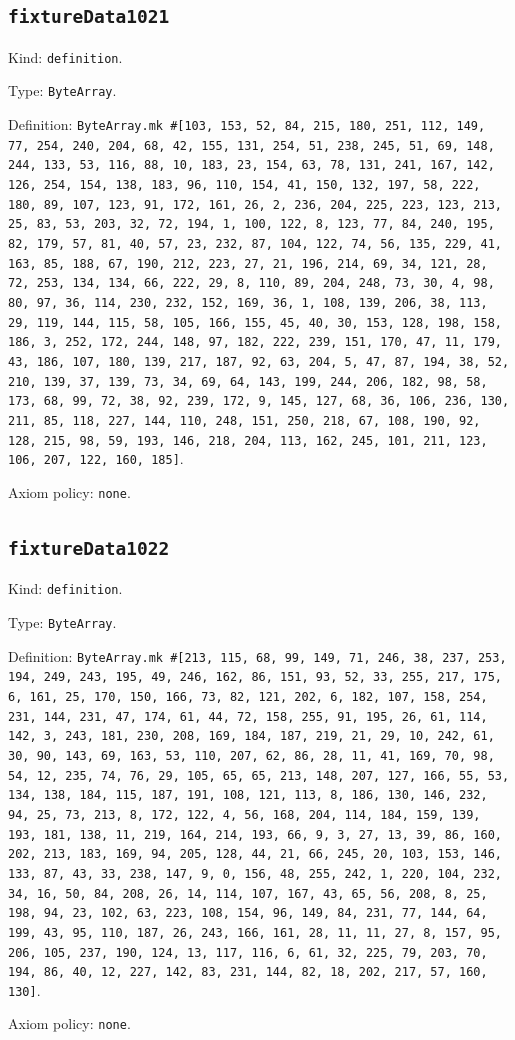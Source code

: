 \documentclass[11pt]{article}
\begin{document}
\subsection*{\texttt{fixtureData1021}}
\noindent Kind: \texttt{definition}.\par
\noindent Type: \texttt{ByteArray}.\par
\noindent Definition: \texttt{ByteArray.mk \#[103, 153, 52, 84, 215, 180, 251, 112, 149, 77, 254, 240, 204, 68, 42, 155, 131, 254, 51, 238, 245, 51, 69, 148, 244, 133, 53, 116, 88, 10, 183, 23, 154, 63, 78, 131, 241, 167, 142, 126, 254, 154, 138, 183, 96, 110, 154, 41, 150, 132, 197, 58, 222, 180, 89, 107, 123, 91, 172, 161, 26, 2, 236, 204, 225, 223, 123, 213, 25, 83, 53, 203, 32, 72, 194, 1, 100, 122, 8, 123, 77, 84, 240, 195, 82, 179, 57, 81, 40, 57, 23, 232, 87, 104, 122, 74, 56, 135, 229, 41, 163, 85, 188, 67, 190, 212, 223, 27, 21, 196, 214, 69, 34, 121, 28, 72, 253, 134, 134, 66, 222, 29, 8, 110, 89, 204, 248, 73, 30, 4, 98, 80, 97, 36, 114, 230, 232, 152, 169, 36, 1, 108, 139, 206, 38, 113, 29, 119, 144, 115, 58, 105, 166, 155, 45, 40, 30, 153, 128, 198, 158, 186, 3, 252, 172, 244, 148, 97, 182, 222, 239, 151, 170, 47, 11, 179, 43, 186, 107, 180, 139, 217, 187, 92, 63, 204, 5, 47, 87, 194, 38, 52, 210, 139, 37, 139, 73, 34, 69, 64, 143, 199, 244, 206, 182, 98, 58, 173, 68, 99, 72, 38, 92, 239, 172, 9, 145, 127, 68, 36, 106, 236, 130, 211, 85, 118, 227, 144, 110, 248, 151, 250, 218, 67, 108, 190, 92, 128, 215, 98, 59, 193, 146, 218, 204, 113, 162, 245, 101, 211, 123, 106, 207, 122, 160, 185]}.\par
\noindent Axiom policy: \texttt{none}.\par
\subsection*{\texttt{fixtureData1022}}
\noindent Kind: \texttt{definition}.\par
\noindent Type: \texttt{ByteArray}.\par
\noindent Definition: \texttt{ByteArray.mk \#[213, 115, 68, 99, 149, 71, 246, 38, 237, 253, 194, 249, 243, 195, 49, 246, 162, 86, 151, 93, 52, 33, 255, 217, 175, 6, 161, 25, 170, 150, 166, 73, 82, 121, 202, 6, 182, 107, 158, 254, 231, 144, 231, 47, 174, 61, 44, 72, 158, 255, 91, 195, 26, 61, 114, 142, 3, 243, 181, 230, 208, 169, 184, 187, 219, 21, 29, 10, 242, 61, 30, 90, 143, 69, 163, 53, 110, 207, 62, 86, 28, 11, 41, 169, 70, 98, 54, 12, 235, 74, 76, 29, 105, 65, 65, 213, 148, 207, 127, 166, 55, 53, 134, 138, 184, 115, 187, 191, 108, 121, 113, 8, 186, 130, 146, 232, 94, 25, 73, 213, 8, 172, 122, 4, 56, 168, 204, 114, 184, 159, 139, 193, 181, 138, 11, 219, 164, 214, 193, 66, 9, 3, 27, 13, 39, 86, 160, 202, 213, 183, 169, 94, 205, 128, 44, 21, 66, 245, 20, 103, 153, 146, 133, 87, 43, 33, 238, 147, 9, 0, 156, 48, 255, 242, 1, 220, 104, 232, 34, 16, 50, 84, 208, 26, 14, 114, 107, 167, 43, 65, 56, 208, 8, 25, 198, 94, 23, 102, 63, 223, 108, 154, 96, 149, 84, 231, 77, 144, 64, 199, 43, 95, 110, 187, 26, 243, 166, 161, 28, 11, 11, 27, 8, 157, 95, 206, 105, 237, 190, 124, 13, 117, 116, 6, 61, 32, 225, 79, 203, 70, 194, 86, 40, 12, 227, 142, 83, 231, 144, 82, 18, 202, 217, 57, 160, 130]}.\par
\noindent Axiom policy: \texttt{none}.\par
\end{document}

